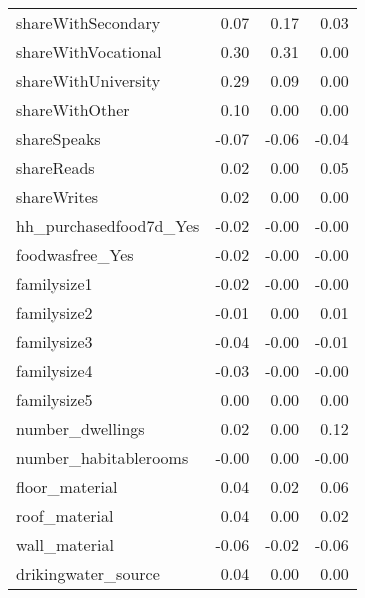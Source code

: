 \begin{longtable}{lrrr}
shareWithSecondary &                0.07 &                0.17 &                      0.03 \\
shareWithVocational &                0.30 &                0.31 &                      0.00 \\
shareWithUniversity &                0.29 &                0.09 &                      0.00 \\
shareWithOther &                0.10 &                0.00 &                      0.00 \\
shareSpeaks &               -0.07 &               -0.06 &                     -0.04 \\
shareReads &                0.02 &                0.00 &                      0.05 \\
shareWrites &                0.02 &                0.00 &                      0.00 \\
hh\_purchasedfood7d\_Yes &               -0.02 &               -0.00 &                     -0.00 \\
foodwasfree\_Yes &               -0.02 &               -0.00 &                     -0.00 \\
familysize1 &               -0.02 &               -0.00 &                     -0.00 \\
familysize2 &               -0.01 &                0.00 &                      0.01 \\
familysize3 &               -0.04 &               -0.00 &                     -0.01 \\
familysize4 &               -0.03 &               -0.00 &                     -0.00 \\
familysize5 &                0.00 &                0.00 &                      0.00 \\
number\_dwellings &                0.02 &                0.00 &                      0.12 \\
number\_habitablerooms &               -0.00 &                0.00 &                     -0.00 \\
floor\_material &                0.04 &                0.02 &                      0.06 \\
roof\_material &                0.04 &                0.00 &                      0.02 \\
wall\_material &               -0.06 &               -0.02 &                     -0.06 \\
drikingwater\_source &                0.04 &                0.00 &                      0.00 \\

\end{longtable}
